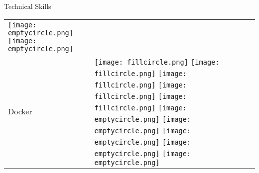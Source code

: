 \documentclass{resume}
\begin{document}
\begin{rSection}{Technical Skills}
\begin{table}[h!]
\begin{tabular}{p{10cm}p{6cm}}
  \texttt{[image: emptycircle.png]} 
  \texttt{[image: emptycircle.png]} \\
  Docker & 
  \texttt{[image: fillcircle.png]} 
  \texttt{[image: fillcircle.png]} 
  \texttt{[image: fillcircle.png]}
  \texttt{[image: fillcircle.png]} 
  \texttt{[image: fillcircle.png]}
  \texttt{[image: emptycircle.png]} 
  \texttt{[image: emptycircle.png]}
  \texttt{[image: emptycircle.png]} 
  \texttt{[image: emptycircle.png]} 
  \texttt{[image: emptycircle.png]} \\
  \end{tabular}
\end{table}


\end{rSection}
\end{document}
